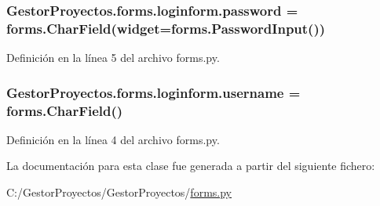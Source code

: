 \subsubsection[{\texorpdfstring{password}{password}}]{\setlength{\rightskip}{0pt plus 5cm}Gestor\+Proyectos.\+forms.\+loginform.\+password = forms.\+Char\+Field(widget=forms.\+Password\+Input())\hspace{0.3cm}{\ttfamily [static]}}\hypertarget{class_gestor_proyectos_1_1forms_1_1loginform_a1c5ce794cd36522009344ea46565dcf6}{}\label{class_gestor_proyectos_1_1forms_1_1loginform_a1c5ce794cd36522009344ea46565dcf6}


Definición en la línea 5 del archivo forms.\+py.

\subsubsection[{\texorpdfstring{username}{username}}]{\setlength{\rightskip}{0pt plus 5cm}Gestor\+Proyectos.\+forms.\+loginform.\+username = forms.\+Char\+Field()\hspace{0.3cm}{\ttfamily [static]}}\hypertarget{class_gestor_proyectos_1_1forms_1_1loginform_af0787c8288a4ba3b5651861969cbfe9f}{}\label{class_gestor_proyectos_1_1forms_1_1loginform_af0787c8288a4ba3b5651861969cbfe9f}


Definición en la línea 4 del archivo forms.\+py.



La documentación para esta clase fue generada a partir del siguiente fichero\+:\begin{DoxyCompactItemize}
\item 
C\+:/\+Gestor\+Proyectos/\+Gestor\+Proyectos/\hyperlink{_gestor_proyectos_2forms_8py}{forms.\+py}\end{DoxyCompactItemize}
